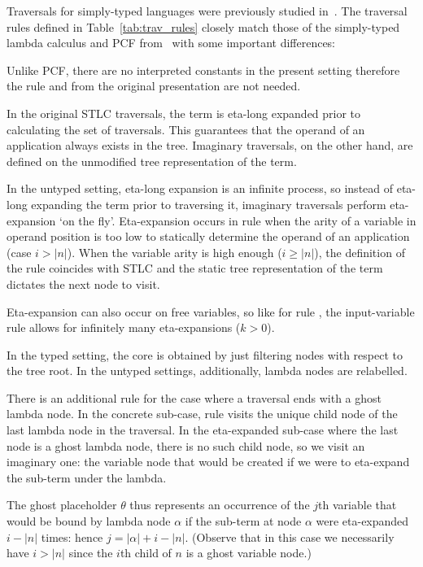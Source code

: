 \documentclass{elsarticle}
\theoremstyle{plain}
\theoremstyle{definition}
\theoremstyle{remark}
\newcommand{\ghostlmd}{{\lambda\!\!\lambda}}
\newcommand{\ghostvar}{\theta}
\begin{document}
Traversals for simply-typed languages were previously studied in~\cite{BlumPhd}.
The traversal rules defined in Table~\ref{tab:trav_rules} closely match those of the simply-typed lambda calculus and PCF from~\cite{BlumPhd} with some important differences:
\begin{description}[nosep]
  \item[No interpreted constants] Unlike PCF, there are no interpreted constants in the present setting therefore the rule  and  from the original presentation are not needed.

  \item[No $\eta$-long expansion] In the original STLC traversals, the term is eta-long expanded prior to calculating the set of traversals. This guarantees that the operand of an application always exists in the tree.
  Imaginary traversals, on the other hand, are defined on the unmodified tree representation of the term.

  \item[On-the-fly $\eta$-expansion] In the untyped setting, eta-long expansion is an infinite process, so instead of eta-long expanding the term prior to traversing it, imaginary traversals perform eta-expansion  `on the fly'. Eta-expansion occurs in rule  when the arity of a variable in operand position is too low to statically determine the operand of an application (case $i>|n|$). When the variable arity is high enough ($i\geq|n|$), the definition of the rule coincides with STLC and the static tree representation of the term dictates the next node to visit.

  \item[Free variables] Eta-expansion can also occur on free variables, so like for  rule , the input-variable rule allows for infinitely many eta-expansions ($k>0$).

  \item[Traversal core] In the typed setting, the core is  obtained by just filtering nodes with respect to the tree root. In the untyped settings, additionally, lambda nodes are relabelled.

  \item[Traversing ghost nodes] There is an additional rule \rulenamet{Lam^\ghostlmd} for the case where a traversal ends with a ghost lambda node. In the concrete sub-case, rule  visits the unique child node of the last lambda node in the traversal. In the eta-expanded sub-case where the last node is a ghost lambda node, there is no such child node, so we visit an imaginary one: the variable node that would be created if we were to eta-expand the sub-term under the lambda.

   The ghost placeholder $\ghostvar$ thus represents an occurrence of the $j$th variable that would be bound by lambda node $\alpha$ if the sub-term at node $\alpha$ were eta-expanded $i-|n|$ times: hence $j = |\alpha| + i - |n|$.
   (Observe that in this case we necessarily have $i>|n|$ since the $i$th child of $n$ is a ghost variable node.)
\end{description}
\end{document}

